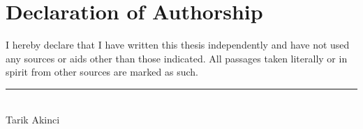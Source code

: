 \section*{Declaration of Authorship}

I hereby declare that I have written this thesis independently and have not
used any sources or aids other than those indicated. All passages taken
literally or in spirit from other sources are marked as such.

\vspace{2cm}
\noindent{} \hfill \rule{6cm}{0.4pt}\\
\hspace*{\fill}Tarik Akinci
